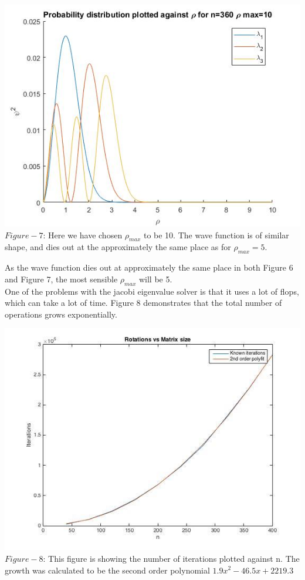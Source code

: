 \documentclass[10pt,a4paper]{article}
\begin{document}
\begin{center}
\includegraphics[scale=0.55]{eig360Rho10.jpg}
$Figure-7$: Here we have chosen ${\rho}_{max}$ to be 10. The wave function is of similar shape, and dies out at the approximately the same place as for ${\rho}_{max}=5$. 
\end{center}

\noindent As the wave function dies out at approximately the same place in both Figure 6 and Figure 7, the most sensible ${\rho}_{max}$ will be 5. \\

\noindent One of the problems with the jacobi eigenvalue solver is that it uses a lot of flops, which can take a lot of time. Figure 8 demonstrates that the total number of operations grows exponentially. 
\begin{center}
\includegraphics[scale=0.6]{itvsmatsize.jpg}
$Figure-8$: This figure is showing the number of iterations plotted against n. The growth was calculated to be the second order polynomial $1.9x^2-46.5x+2219.3$
\end{center}
\end{document}
